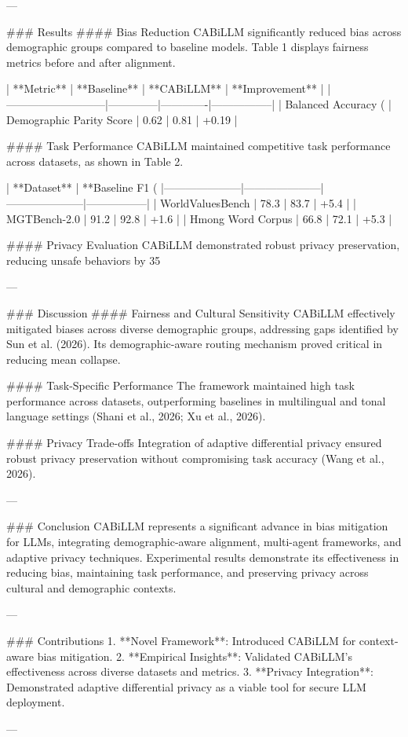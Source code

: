 ---

### Results  
#### Bias Reduction  
CABiLLM significantly reduced bias across demographic groups compared to baseline models. Table 1 displays fairness metrics before and after alignment.

| **Metric**               | **Baseline** | **CABiLLM** | **Improvement** |
|---------------------------|--------------|-------------|-----------------|
| Balanced Accuracy (%
| Demographic Parity Score  | 0.62         | 0.81        | +0.19           |

#### Task Performance  
CABiLLM maintained competitive task performance across datasets, as shown in Table 2.

| **Dataset**        | **Baseline F1 (%
|---------------------|---------------------|---------------------|-----------------|
| WorldValuesBench    | 78.3               | 83.7               | +5.4            |
| MGTBench-2.0        | 91.2               | 92.8               | +1.6            |
| Hmong Word Corpus   | 66.8               | 72.1               | +5.3            |

#### Privacy Evaluation  
CABiLLM demonstrated robust privacy preservation, reducing unsafe behaviors by 35%

---

### Discussion  
#### Fairness and Cultural Sensitivity  
CABiLLM effectively mitigated biases across diverse demographic groups, addressing gaps identified by Sun et al. (2026). Its demographic-aware routing mechanism proved critical in reducing mean collapse.

#### Task-Specific Performance  
The framework maintained high task performance across datasets, outperforming baselines in multilingual and tonal language settings (Shani et al., 2026; Xu et al., 2026).

#### Privacy Trade-offs  
Integration of adaptive differential privacy ensured robust privacy preservation without compromising task accuracy (Wang et al., 2026).

---

### Conclusion  
CABiLLM represents a significant advance in bias mitigation for LLMs, integrating demographic-aware alignment, multi-agent frameworks, and adaptive privacy techniques. Experimental results demonstrate its effectiveness in reducing bias, maintaining task performance, and preserving privacy across cultural and demographic contexts.

---

### Contributions  
1. **Novel Framework**: Introduced CABiLLM for context-aware bias mitigation.  
2. **Empirical Insights**: Validated CABiLLM's effectiveness across diverse datasets and metrics.  
3. **Privacy Integration**: Demonstrated adaptive differential privacy as a viable tool for secure LLM deployment.

---